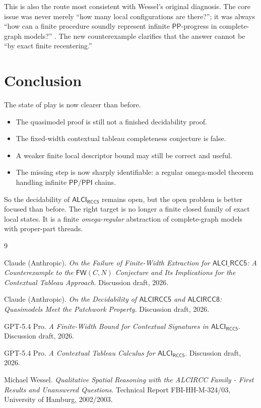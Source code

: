 \documentclass[11pt]{article}
\newcommand{\ALCIRCC}{\mathsf{ALCI}_{\mathsf{RCC5}}}
\newcommand{\Pp}{\mathsf{PP}}
\newcommand{\Ppi}{\mathsf{PPI}}
\begin{document}
This is also the route most consistent with Wessel's original diagnosis. The core issue was never merely ``how many local configurations are there?''; it was always ``how can a finite procedure soundly represent infinite $\Pp$-progress in complete-graph models?'' \cite{Wessel2003}. The new counterexample clarifies that the answer cannot be ``by exact finite recentering.''

\section{Conclusion}

The state of play is now clearer than before.

\begin{itemize}
\item The quasimodel proof is still not a finished decidability proof.
\item The fixed-width contextual tableau completeness conjecture is false.
\item A weaker finite local descriptor bound may still be correct and useful.
\item The missing step is now sharply identifiable: a regular omega-model theorem handling infinite $\Pp/\Ppi$ chains.
\end{itemize}

So the decidability of $\ALCIRCC$ remains open, but the open problem is better focused than before. The right target is no longer a finite closed family of exact local states. It is a finite \emph{omega-regular} abstraction of complete-graph models with proper-part threads.

\begin{thebibliography}{9}

Claude (Anthropic).
\newblock \emph{On the Failure of Finite-Width Extraction for $\mathsf{ALCI\_RCC5}$: A Counterexample to the $\mathsf{FW}(C,N)$ Conjecture and Its Implications for the Contextual Tableau Approach}.
\newblock Discussion draft, 2026.

Claude (Anthropic).
\newblock \emph{On the Decidability of $\mathsf{ALCIRCC5}$ and $\mathsf{ALCIRCC8}$: Quasimodels Meet the Patchwork Property}.
\newblock Discussion draft, 2026.

GPT-5.4 Pro.
\newblock \emph{A Finite-Width Bound for Contextual Signatures in $\mathsf{ALCI}_{\mathsf{RCC5}}$}.
\newblock Discussion draft, 2026.

GPT-5.4 Pro.
\newblock \emph{A Contextual Tableau Calculus for $\mathsf{ALCI}_{\mathsf{RCC5}}$}.
\newblock Discussion draft, 2026.

Michael Wessel.
\newblock \emph{Qualitative Spatial Reasoning with the ALCIRCC Family - First Results and Unanswered Questions}.
\newblock Technical Report FBI-HH-M-324/03, University of Hamburg, 2002/2003.

\end{thebibliography}
\end{document}
